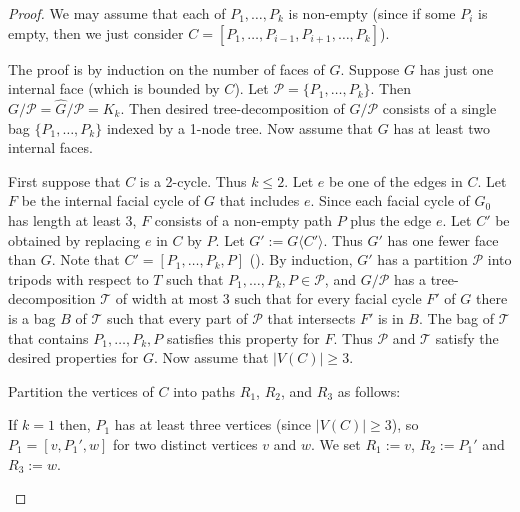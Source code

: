 \documentclass{patmorin}
\theoremstyle{plain}
\theoremstyle{definition}
\newcommand{\note}[2]{\noindent{\color{red}[#1:~#2]}}
\newcommand{\TT}{\mathcal{T}}
\newcommand{\PP}{\mathcal{P}}
\renewcommand{\geq}{\geqslant}
\renewcommand{\leq}{\leqslant}
\begin{document}
\begin{proof}
We may assume that each of $P_1,\dots,P_k$ is non-empty (since if some $P_i$ is empty, then we just consider $C=[P_1,\dots,P_{i-1},P_{i+1},\dots,P_k]$).

The proof is by induction on the number of faces of $G$. Suppose $G$ has just one internal face (which is bounded by $C$). Let $\PP=\{P_1,\ldots,P_k\}$.
Then $G/\PP=\widehat{G}/\PP = K_k$. Then desired tree-decomposition of $G/\PP$ consists of a single bag $\{P_1,\ldots,P_k\}$ indexed by a 1-node tree. Now assume that $G$ has at least two internal faces.

First suppose that $C$ is a 2-cycle. Thus $k\leq 2$. Let $e$ be one of the edges in $C$. Let $F$ be the internal facial cycle of $G$ that includes $e$. Since each facial cycle of $G_0$ has length at least 3, $F$ consists of a non-empty path $P$ plus the edge $e$. Let $C'$ be obtained by replacing $e$ in $C$ by $P$. Let $G':=G\langle{C'}\rangle$. Thus $G'$ has one fewer face than $G$. Note that $C'=[P_1,\dots,P_k,P]$ (\note{DW}{or it can be written that way?}).  By induction, $G'$ has a partition $\PP$ into tripods with respect to $T$ such that $P_1,\dots,P_k,P\in\PP$, and $G / \PP$ has a tree-decomposition $\mathcal{T}$ of width at most 3 such that for every facial cycle $F'$ of $G$ there is a bag $B$ of $\mathcal{T}$ such that every part of $\PP$ that intersects $F'$ is in $B$. The bag of $\mathcal{T}$ that contains $P_1,\dots,P_k,P$ satisfies this property for $F$. Thus $\PP$ and $\TT$ satisfy the desired properties for $G$. Now assume that $|V(C)|\geq 3$.



Partition the vertices of $C$ into paths $R_1$, $R_2$, and $R_3$ as follows:
\begin{compactenum}
	\item If $k=1$ then, $P_1$ has at least three vertices (since $|V(C)|\geq 3$), so $P_1=[v, P_1', w]$ for two distinct vertices $v$ and $w$. We set $R_1:=v$, $R_2:=P_1'$ and $R_3:=w$.


\end{compactenum}
\end{proof}
\end{document}
